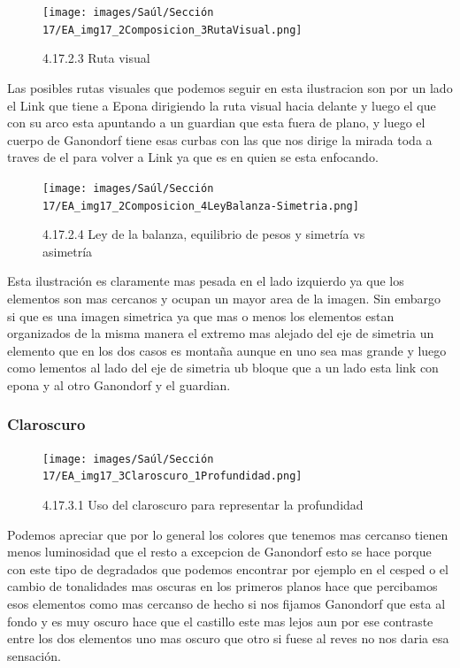 \documentclass[12pt]{article}
\begin{document}
      \begin{figure}[H]
        \centering
        \texttt{[image: images/Saúl/Sección 17/EA\_img17\_2Composicion\_3RutaVisual.png]}
        \caption{\small 4.17.2.3 Ruta visual}
      \end{figure}
      Las posibles rutas visuales que podemos seguir en esta ilustracion son por un lado el Link que tiene a Epona dirigiendo la ruta visual hacia delante y luego el que con su arco esta apuntando a un guardian que esta fuera de plano, y luego el cuerpo de Ganondorf tiene esas curbas con las que nos dirige la mirada toda a traves de el para volver a Link ya que es en quien se esta enfocando.


      \begin{figure}[H]
        \centering
        \texttt{[image: images/Saúl/Sección 17/EA\_img17\_2Composicion\_4LeyBalanza-Simetria.png]}
        \caption{\small 4.17.2.4 Ley de la balanza, equilibrio de pesos y simetría vs asimetría}
      \end{figure}
      Esta ilustración es claramente mas pesada en el lado izquierdo ya que los elementos son mas cercanos y ocupan un mayor area de la imagen. Sin embargo si que es una imagen simetrica ya que mas o menos los elementos estan organizados de la misma manera el extremo mas alejado del eje de simetria un elemento que en los dos casos es montaña aunque en uno sea mas grande y luego como lementos al lado del eje de simetria ub bloque que a un lado esta link con epona y al otro Ganondorf y el guardian.


      \subsubsection{Claroscuro}

        
        \begin{figure}[H]
          \centering
          \texttt{[image: images/Saúl/Sección 17/EA\_img17\_3Claroscuro\_1Profundidad.png]}
          \caption{\small 4.17.3.1 Uso del claroscuro para representar la profundidad}
        \end{figure}
        Podemos apreciar que por lo general los colores que tenemos mas cercanso tienen menos luminosidad que el resto a excepcion de Ganondorf esto se hace porque con este tipo de degradados que podemos encontrar por ejemplo en el cesped o el cambio de tonalidades mas oscuras en los primeros planos hace que percibamos esos elementos como mas cercanso de hecho si nos fijamos Ganondorf que esta al fondo y es muy oscuro hace que el castillo este mas lejos aun por ese contraste entre los dos elementos uno mas oscuro que otro si fuese al reves no nos daria esa sensación.
\end{document}
